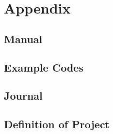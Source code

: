 \appendix
\part*{Appendix}

\chapter{Manual}





\chapter{Example Codes}
\label{ctr:exampleCode}


\chapter{Journal}


\chapter{Definition of Project}
\begin{figure}[H]
\centering
\setlength\fboxsep{0pt}
\setlength\fboxrule{0.5pt}
\end{figure}
